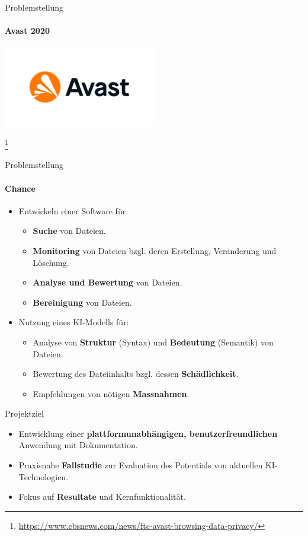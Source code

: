 \documentclass[
    ngerman,%
    authorontitle=true,
]{bfhbeamer}
\begin{document}
    \begin{frame}{Problemstellung}
        \framesubtitle{Avast 2020}
        \begin{center}
            \includegraphics[width=0.5\textwidth]{assets/presentation/avast-logo}
        \end{center}
        \footnote{\url{https://www.cbsnews.com/news/ftc-avast-browsing-data-privacy/}}
    \end{frame}

    \begin{frame}{Problemstellung}
        \framesubtitle{Chance}
        \begin{itemize}

            \item Entwickeln einer Software f\"ur:
            \begin{itemize}
                \item \textbf{Suche} von Dateien.
                \item \textbf{Monitoring} von Dateien bzgl. deren Erstellung, Ver\"anderung und L\"oschung.
                \item \textbf{Analyse und Bewertung} von Dateien.
                \item \textbf{Bereinigung} von Dateien.
            \end{itemize}
            \item Nutzung eines KI-Modells f\"ur:
            \begin{itemize}
                \item Analyse von \textbf{Struktur} (Syntax) und \textbf{Bedeutung} (Semantik) von Dateien.
                \item Bewertung des Dateiinhalts bzgl.
                dessen \textbf{Schädlichkeit}.
                \item Empfehlungen von n\"otigen \textbf{Massnahmen}.
            \end{itemize}
        \end{itemize}
    \end{frame}

    \begin{frame}{Projektziel}
        \begin{itemize}
            \item Entwicklung einer \textbf{plattformunabh\"angigen, benutzerfreundlichen} Anwendung mit Dokumentation.
            \item Praxisnahe \textbf{Fallstudie} zur Evaluation des Potentials von aktuellen KI-Technologien.
            \item Fokus auf \textbf{Resultate} und Kernfunktionalit\"at.
        \end{itemize}
    \end{frame}
\end{document}

